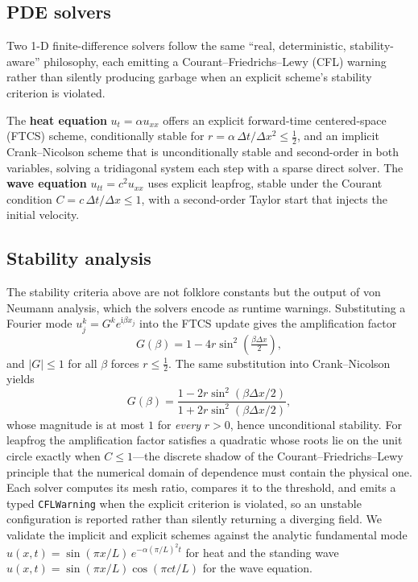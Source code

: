 \documentclass[sigplan,nonacm,screen,review]{acmart}
\begin{document}
\subsection{PDE solvers}
Two 1-D finite-difference solvers follow the same ``real, deterministic,
stability-aware'' philosophy, each emitting a Courant--Friedrichs--Lewy (CFL)
warning rather than silently
producing garbage when an explicit scheme's stability criterion is violated.

The \textbf{heat equation} $u_t = \alpha u_{xx}$ offers an explicit
forward-time centered-space (FTCS) scheme, conditionally stable for
$r = \alpha\,\Delta t/\Delta x^2 \le \tfrac12$, and an implicit
Crank--Nicolson scheme that is unconditionally stable and second-order in both
variables, solving a tridiagonal system each step with a sparse direct solver.
The \textbf{wave equation} $u_{tt} = c^2 u_{xx}$ uses explicit leapfrog, stable
under the Courant condition $C = c\,\Delta t/\Delta x \le 1$, with a
second-order Taylor start that injects the initial velocity.

\subsection{Stability analysis}
The stability criteria above are not folklore constants but the output of von
Neumann analysis, which the solvers encode as runtime warnings. Substituting a
Fourier mode $u_j^k = G^k e^{\mathrm{i}\beta x_j}$ into the FTCS update gives the
amplification factor
\[
  G(\beta) = 1 - 4r\sin^2\!\left(\tfrac{\beta \Delta x}{2}\right),
\]
and $|G| \le 1$ for all $\beta$ forces $r \le \tfrac12$. The same substitution into
Crank--Nicolson yields
\[
  G(\beta) = \frac{1 - 2r\sin^2(\beta\Delta x/2)}
                  {1 + 2r\sin^2(\beta\Delta x/2)},
\]
whose magnitude is at most $1$ for \emph{every} $r > 0$, hence unconditional
stability. For leapfrog the amplification factor satisfies a quadratic whose roots
lie on the unit circle exactly when $C \le 1$---the discrete shadow of the
Courant--Friedrichs--Lewy principle that the numerical domain of dependence must
contain the physical one. Each solver computes its mesh ratio, compares it to the
threshold, and emits a typed \texttt{CFLWarning} when the explicit criterion is
violated, so an unstable configuration is reported rather than silently returning
a diverging field. We validate the implicit and explicit schemes against the
analytic fundamental mode $u(x,t) = \sin(\pi x/L)\,e^{-\alpha(\pi/L)^2 t}$ for heat
and the standing wave $u(x,t) = \sin(\pi x/L)\cos(\pi c t/L)$ for the wave
equation.
\end{document}
